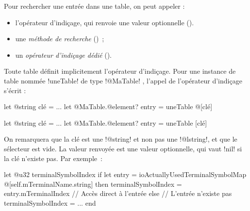 
Pour rechercher une entrée dans une table, on peut appeler :
\begin{itemize}
  \item l'opérateur d'indiçage, qui renvoie une valeur optionnelle ().
  \item une \emph{méthode de recherche} ()~;
  \item un \emph{opérateur d'indiçage dédié} ().
\end{itemize}










Toute table définit implicitement l'opérateur d'indiçage. Pour une instance de table nommée \ggsq!uneTable! de type \ggsq!@MaTable! , l'appel de l'opérateur d'indiçage s'écrit :

\begin{galgas4}
let @string clé = ...
let @MaTable.@element? entry = uneTable @[clé]
\end{galgas4}

\begin{galgas4}
let @string clé = ...
let @MaTable.@element? entry = uneTable [clé]
\end{galgas4}

On remarquera que la clé est une \ggsq!@string! et non pas une \ggsq!@lstring!, et que le sélecteur est vide. La valeur renvoyée est une valeur optionnelle, qui vaut \ggsq!nil! si la clé n'existe pas. Par exemple~:

%
%

\begin{galgas4}
let @u32 terminalSymbolIndex
if let entry = ioActuallyUsedTerminalSymbolMap @[self.mTerminalName.string] then
  terminalSymbolIndex = entry.mTerminalIndex // Accès direct à l'entrée
else // L'entrée n'existe pas
  terminalSymbolIndex = ...
end
\end{galgas4}


